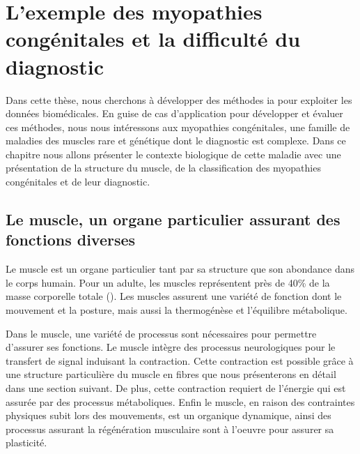 \chapter{L’exemple des myopathies congénitales et la difficulté du diagnostic}
Dans cette thèse, nous cherchons à développer des méthodes \gls{ia} pour exploiter les données biomédicales. En guise de cas d'application pour développer et évaluer ces méthodes, nous  nous intéressons aux myopathies congénitales, une famille de maladies des muscles rare et génétique dont le diagnostic est complexe. Dans ce chapitre nous allons présenter le contexte biologique de cette maladie avec une présentation de la structure du muscle, de la classification des myopathies congénitales et de leur diagnostic.

\section{Le muscle, un organe particulier assurant des fonctions diverses}
Le muscle est un organe particulier tant par sa structure que son abondance dans le corps humain. Pour un adulte, les muscles représentent près de 40\% de la masse corporelle totale (\cite{janssen_skeletal_2000}). Les muscles assurent une variété de fonction dont le mouvement et la posture, mais aussi la thermogénèse et l'équilibre métabolique.

Dans le muscle, une variété de processus sont nécessaires pour permettre d'assurer ses fonctions. Le muscle intègre des processus neurologiques pour le transfert de signal induisant la contraction. Cette contraction est possible grâce à une structure particulière du muscle en fibres que nous présenterons en détail dans une section suivant. De plus, cette contraction requiert de l'énergie qui est assurée par des processus métaboliques. Enfin le muscle, en raison des contraintes physiques subit lors des mouvements, est un organique dynamique, ainsi des processus assurant la régénération musculaire sont à l'oeuvre pour assurer sa plasticité.

